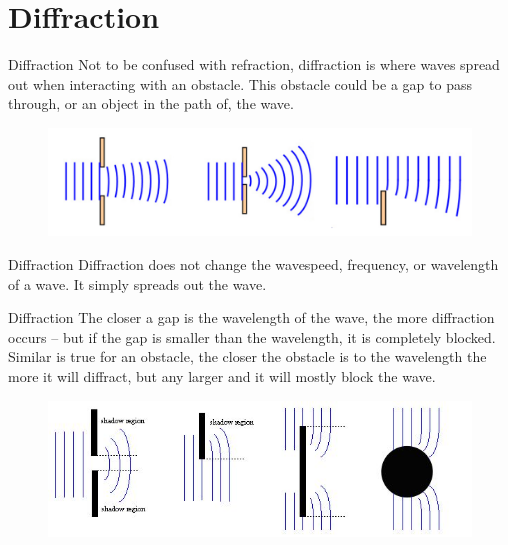 \documentclass[../Main.tex]{subfiles}
\begin{document}
\author{Diffraction} %
\date{Year 1 Topic 18} %

\section{Diffraction} %

\begin{frame}{Diffraction}
    Not to be confused with refraction, diffraction is where waves spread out when interacting with an obstacle. This obstacle could be a gap to pass through, or an object in the path of, the wave. 
    
    \begin{figure}
        \centering
        \includegraphics[width=\textwidth]{Waves_Images/diffraction.png}
    \end{figure}
    \pause
    \begin{block}{Diffraction}
    Diffraction does not change the wavespeed, frequency, or wavelength of a wave. It simply spreads out the wave. 
    \end{block}
\end{frame}

\begin{frame}{Diffraction}
    The closer a gap is the wavelength of the wave, the more diffraction occurs -- but if the gap is smaller than the wavelength, it is completely blocked. \pause
    \newline
    Similar is true for an obstacle, the closer the obstacle is to the wavelength the more it will diffract, but any larger and it will mostly block the wave.
    
    \begin{figure}
        \centering
        \includegraphics[width=\textwidth]{Waves_Images/shadowregion.png}
    \end{figure}
\end{frame}
\end{document}
